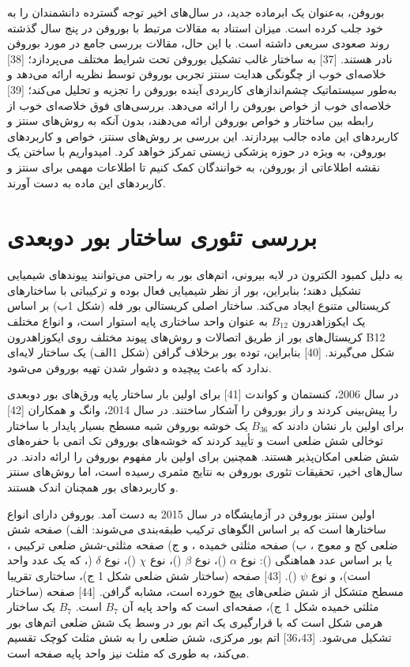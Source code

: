 بوروفن، به‌عنوان یک ابرماده جدید، در سال‌های اخیر توجه گسترده دانشمندان را به خود جلب کرده است. میزان استناد به مقالات مرتبط با بوروفن در پنج سال گذشته روند صعودی سریعی داشته است. با این حال، مقالات بررسی جامع در مورد بوروفن نادر هستند. [37] به ساختار غالب تشکیل بوروفن تحت شرایط مختلف می‌پردازد؛ [38] خلاصه‌ای خوب از چگونگی هدایت سنتز تجربی بوروفن توسط نظریه ارائه می‌دهد و به‌طور سیستماتیک چشم‌اندازهای کاربردی آینده بوروفن را تجزیه و تحلیل می‌کند؛ [39] خلاصه‌ای خوب از خواص بوروفن را ارائه می‌دهد. بررسی‌های فوق خلاصه‌ای خوب از رابطه بین ساختار و خواص بوروفن ارائه می‌دهند، بدون آنکه به روش‌های سنتز و کاربردهای این ماده جالب بپردازند. این بررسی بر روش‌های سنتز، خواص و کاربردهای بوروفن، به ویژه در حوزه پزشکی زیستی تمرکز خواهد کرد. امیدواریم با ساختن یک نقشه اطلاعاتی از بوروفن، به خوانندگان کمک کنیم تا اطلاعات مهمی برای سنتز و کاربردهای این ماده به دست آورند.
\section{بررسی تئوری ساختار بور دوبعدی}
به دلیل کمبود الکترون در لایه بیرونی، اتم‌های بور به راحتی می‌توانند پیوندهای شیمیایی تشکیل دهند؛ بنابراین، بور از نظر شیمیایی فعال بوده و ترکیباتی با ساختارهای کریستالی متنوع ایجاد می‌کند. ساختار اصلی کریستالی بور فله (شکل 1ب) بر اساس یک ایکوزاهدرون $B_{12}$ به عنوان واحد ساختاری پایه استوار است، و انواع مختلف کریستال‌های بور از طریق اتصالات و روش‌های پیوند مختلف روی ایکوزاهدرون B12 شکل می‌گیرند. [40] بنابراین، توده بور برخلاف گرافن (شکل 1الف) یک ساختار لایه‌ای ندارد که باعث پیچیده و دشوار شدن تهیه بوروفن می‌شود.

در سال 2006، کنستمان و کواندت [41] برای اولین بار ساختار پایه ورق‌های بور دوبعدی را پیش‌بینی کردند و راز بوروفن را آشکار ساختند. در سال 2014، وانگ و همکاران [42] برای اولین بار نشان دادند که $B_{36}$ یک خوشه بوروفن شبه مسطح بسیار پایدار با ساختار توخالی شش ضلعی است و تأیید کردند که خوشه‌های بوروفن تک اتمی با حفره‌های شش ضلعی امکان‌پذیر هستند. همچنین برای اولین بار مفهوم بوروفن را ارائه دادند. در سال‌های اخیر، تحقیقات تئوری بوروفن به نتایج مثمری رسیده است، اما روش‌های سنتز و کاربردهای بور همچنان اندک هستند.

اولین سنتز بوروفن در آزمایشگاه در سال 2015 به دست آمد. بوروفن دارای انواع ساختارها است که بر اساس الگوهای ترکیب طبقه‌بندی می‌شوند: الف) صفحه شش ضلعی کج‌ و معوج ، ب) صفحه مثلثی خمیده ، و ج) صفحه مثلثی-شش ضلعی ترکیبی ، یا بر اساس عدد هماهنگی (): نوع $\alpha$ ()، نوع $\beta$ ()، نوع $\chi$ ()، نوع $\delta$ (، که  یک عدد واحد است)، و نوع $\psi$ (). [43]
صفحه  (ساختار شش ضلعی شکل 1 ج)، ساختاری تقریبا مسطح متشکل از شش ضلعی‌های پیچ خورده است، مشابه گرافن. [44] صفحه  (ساختار مثلثی خمیده شکل 1 ج)، صفحه‌ای است که واحد پایه آن $B_7$ است. $B_7$ یک ساختار هرمی شکل است که با قرارگیری یک اتم بور در وسط یک شش ضلعی اتم‌های بور تشکیل می‌شود. [36،43] اتم بور مرکزی، شش ضلعی را به شش مثلث کوچک تقسیم می‌کند، به طوری که مثلث نیز واحد پایه صفحه  است.

